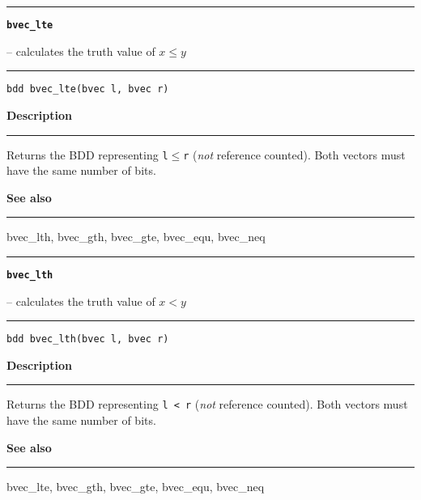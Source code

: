 \begin{minipage}{\textwidth}

\noindent\begin{minipage}{\textwidth}
\rule{\textwidth}{0.5mm}
{\tt\bf bvec\_lte }
\--- calculates the truth value of $x \leq y$  \hspace{\fill}
\\\rule[1.5ex]{\textwidth}{0.5mm}
\end{minipage}

\noindent\begin{verbatim}
bdd bvec_lte(bvec l, bvec r) 
\end{verbatim}

\vspace{\parsep}\noindent
{\bf Description}\\\rule[1.5ex]{\textwidth}{0.2mm}\vspace{-1.5ex}\setlength{\parindent}{1em}
Returns the BDD representing {\tt l}$\leq${\tt r}
           ({\em not} reference counted). Both vectors must have the
	   same number of bits. 

\vspace{\parsep}\vspace{\baselineskip}\noindent
{\bf See also}\\\rule[1.5ex]{\textwidth}{0.2mm}\vspace{-1.5ex}
bvec\_lth, bvec\_gth, bvec\_gte, bvec\_equ, bvec\_neq 
\end{minipage}
\vspace{8ex}
\begin{minipage}{\textwidth}

\noindent\begin{minipage}{\textwidth}
\rule{\textwidth}{0.5mm}
{\tt\bf bvec\_lth }
\--- calculates the truth value of $x < y$  \hspace{\fill}
\\\rule[1.5ex]{\textwidth}{0.5mm}
\end{minipage}

\noindent\begin{verbatim}
bdd bvec_lth(bvec l, bvec r) 
\end{verbatim}

\vspace{\parsep}\noindent
{\bf Description}\\\rule[1.5ex]{\textwidth}{0.2mm}\vspace{-1.5ex}\setlength{\parindent}{1em}
Returns the BDD representing {\tt l < r}
           ({\em not} reference counted). Both vectors must have the
	   same number of bits. 

\vspace{\parsep}\vspace{\baselineskip}\noindent
{\bf See also}\\\rule[1.5ex]{\textwidth}{0.2mm}\vspace{-1.5ex}
bvec\_lte, bvec\_gth, bvec\_gte, bvec\_equ, bvec\_neq 
\end{minipage}
